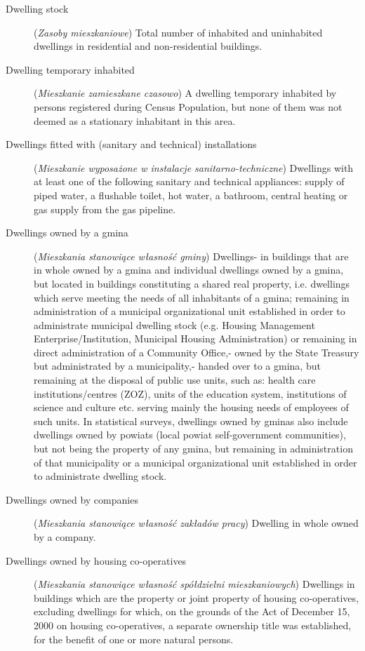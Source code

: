 \documentclass[12pt,a4paper]{article}
\begin{document}
\begin{description}
\item[Dwelling stock] (\textit{Zasoby mieszkaniowe}) Total number of inhabited and uninhabited dwellings in residential and non-residential buildings.
\item[Dwelling temporary inhabited] (\textit{Mieszkanie zamieszkane czasowo}) A dwelling temporary inhabited by persons registered  during Census Population, but none of them was not deemed as a stationary inhabitant in this area.
\item[Dwellings fitted with (sanitary and technical) installations] (\textit{Mieszkanie wyposażone w instalacje sanitarno-techniczne}) Dwellings with at least one of the following sanitary and technical appliances: supply of piped water, a flushable toilet, hot water, a bathroom, central heating or gas supply from the gas pipeline.
\item[Dwellings owned by a gmina] (\textit{Mieszkania stanowiące własność gminy}) Dwellings- in buildings that are in whole owned by a gmina and individual dwellings owned by a gmina, but located in buildings constituting a shared real property, i.e. dwellings which serve meeting the needs of all inhabitants of a gmina; remaining in administration of a municipal organizational unit established in order to administrate municipal dwelling stock (e.g. Housing Management Enterprise/Institution, Municipal Housing Administration) or remaining in direct administration of a Community Office,- owned by the State Treasury but administrated by a municipality,- handed over to a gmina, but remaining at the disposal of public use units, such as: health care institutions/centres (ZOZ), units of the education system, institutions of science and culture etc. serving mainly the housing needs of employees of such units. In statistical surveys, dwellings owned by gminas also include dwellings owned by powiats (local powiat self-government communities), but not being the property of any gmina, but remaining in administration of that municipality or a municipal organizational unit established in order to administrate dwelling stock.
\item[Dwellings owned by companies] (\textit{Mieszkania stanowiące własność zakładów pracy}) Dwelling in whole owned by a company.
\item[Dwellings owned by housing co-operatives] (\textit{Mieszkania stanowiące własność spółdzielni mieszkaniowych}) Dwellings in buildings which are the property or joint property of housing co-operatives, excluding dwellings for which, on the grounds of the Act of December 15, 2000 on housing co-operatives, a separate ownership title was established, for the benefit of one or more natural persons.

\end{description}
\end{document}

